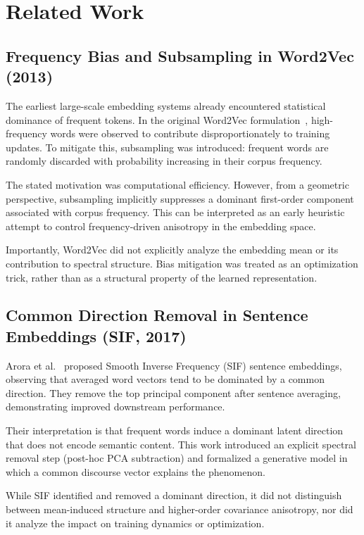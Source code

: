 \section{Related Work}
\label{sec:related}

\subsection{Frequency Bias and Subsampling in Word2Vec (2013)}

The earliest large-scale embedding systems already encountered statistical
dominance of frequent tokens.
In the original Word2Vec formulation~\cite{mikolov2013efficient},
high-frequency words were observed to contribute disproportionately
to training updates.
To mitigate this, subsampling was introduced:
frequent words are randomly discarded with probability increasing
in their corpus frequency.

The stated motivation was computational efficiency.
However, from a geometric perspective,
subsampling implicitly suppresses a dominant first-order component
associated with corpus frequency.
This can be interpreted as an early heuristic attempt to control
frequency-driven anisotropy in the embedding space.

Importantly, Word2Vec did not explicitly analyze the embedding mean
or its contribution to spectral structure.
Bias mitigation was treated as an optimization trick,
rather than as a structural property of the learned representation.

\subsection{Common Direction Removal in Sentence Embeddings (SIF, 2017)}

Arora et al.~\cite{arora2017simple} proposed Smooth Inverse Frequency (SIF)
sentence embeddings, observing that averaged word vectors tend to
be dominated by a common direction.
They remove the top principal component after sentence averaging,
demonstrating improved downstream performance.

Their interpretation is that frequent words induce a dominant
latent direction that does not encode semantic content.
This work introduced an explicit spectral removal step
(post-hoc PCA subtraction) and formalized a generative model
in which a common discourse vector explains the phenomenon.

While SIF identified and removed a dominant direction,
it did not distinguish between mean-induced structure
and higher-order covariance anisotropy,
nor did it analyze the impact on training dynamics or optimization.

